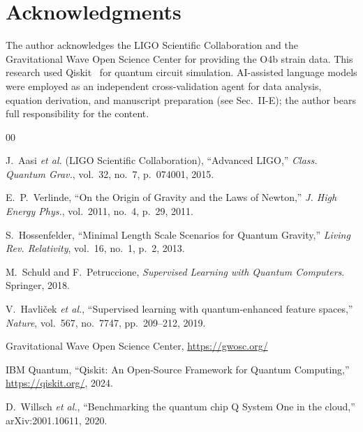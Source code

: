 \documentclass[conference]{IEEEtran}
\begin{document}
\section*{Acknowledgments}

The author acknowledges the LIGO Scientific Collaboration and the Gravitational Wave Open Science Center for providing the O4b strain data. This research used Qiskit~\cite{qiskit2024} for quantum circuit simulation. AI-assisted language models were employed as an independent cross-validation agent for data analysis, equation derivation, and manuscript preparation (see Sec.~II-E); the author bears full responsibility for the content.

\begin{thebibliography}{00}

J.~Aasi \textit{et al.} (LIGO Scientific Collaboration),
``Advanced LIGO,''
\textit{Class. Quantum Grav.}, vol.~32, no.~7, p.~074001, 2015.

E.~P.~Verlinde,
``On the Origin of Gravity and the Laws of Newton,''
\textit{J. High Energy Phys.}, vol.~2011, no.~4, p.~29, 2011.

S.~Hossenfelder,
``Minimal Length Scale Scenarios for Quantum Gravity,''
\textit{Living Rev. Relativity}, vol.~16, no.~1, p.~2, 2013.

M.~Schuld and F.~Petruccione,
\textit{Supervised Learning with Quantum Computers}. Springer, 2018.

V.~Havli\v{c}ek \textit{et al.},
``Supervised learning with quantum-enhanced feature spaces,''
\textit{Nature}, vol.~567, no.~7747, pp.~209--212, 2019.

Gravitational Wave Open Science Center,
\url{https://gwosc.org/}

IBM Quantum,
``Qiskit: An Open-Source Framework for Quantum Computing,''
\url{https://qiskit.org/}, 2024.

D.~Willsch \textit{et al.},
``Benchmarking the quantum chip Q System One in the cloud,''
arXiv:2001.10611, 2020.

\end{thebibliography}
\end{document}
